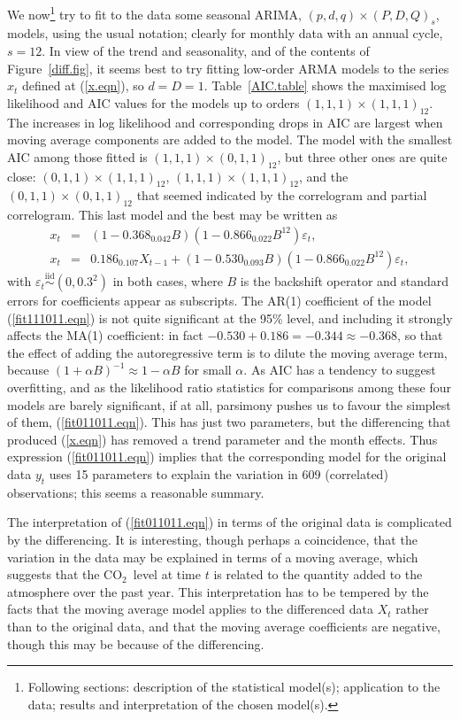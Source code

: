 \documentclass[a4paper,11pt]{article}\usepackage[]{graphicx}\usepackage[]{color}
\newcommand{\iid}{\stackrel{\mathrm{iid}}{\sim}}
\def\CO{{CO$_{2}$}}
\begin{document}
We now\footnote{Following sections: description of the statistical model(s); application to the data; results and interpretation of the chosen model(s).}  try to fit to the data some seasonal ARIMA, $(p,d,q)\times(P,D,Q)_s$, models, using the usual notation; clearly for monthly data with an annual cycle, $s=12$.  In view of the trend and seasonality, and of the contents of Figure~\ref{diff.fig}, it seems best to try fitting low-order ARMA models to the series $x_t$ defined at (\ref{x.eqn}), so $d=D=1$.  Table~\ref{AIC.table} shows the maximised log likelihood and AIC values for the models up to orders $(1,1,1)\times (1,1,1)_{12}$. The increases in log likelihood and corresponding drops in AIC are largest when moving average components are added to the model.  The model with the smallest AIC among those fitted is $(1,1,1)\times (0,1,1)_{12}$, but three other ones are quite close: $(0,1,1)\times (1,1,1)_{12}$, $(1,1,1)\times (1,1,1)_{12}$, and the $(0,1,1)\times (0,1,1)_{12}$ that seemed indicated by the correlogram and partial correlogram. This last model and the best may be written as
\begin{eqnarray}
\label{fit011011.eqn}
x_t &=& (1-0.368_{0.042}B) (1-0.866_{0.022}B^{12})\varepsilon_t, \\
\label{fit111011.eqn}
x_t &=& 0.186_{0.107}X_{t-1}+(1-0.530_{0.093}B) (1-0.866_{0.022}B^{12})\varepsilon_t, 
\end{eqnarray}
with $\varepsilon_t \iid (0, 0.3^2)$ in both cases, where $B$ is the backshift operator and standard errors for coefficients appear as subscripts.  The AR(1) coefficient of the model (\ref{fit111011.eqn}) is not quite significant at the 95\% level, and including it strongly affects the MA(1) coefficient: in fact $-0.530+0.186=-0.344\approx -0.368$, so that the effect of adding the autoregressive term is to dilute the moving average term, because $(1+\alpha B)^{-1} \approx 1 - \alpha B$ for small $\alpha$. As AIC has a tendency to suggest overfitting, and as the likelihood ratio statistics for comparisons among these four models are barely significant, if at all, parsimony pushes us to favour the simplest of them, (\ref{fit011011.eqn}).  This has just two parameters, but the differencing that produced (\ref{x.eqn}) has removed a trend parameter and the month effects. Thus expression (\ref{fit011011.eqn}) implies that the corresponding model for the original data $y_t$ uses 15 parameters to explain the variation in 609 (correlated) observations; this seems a reasonable summary.

The interpretation of (\ref{fit011011.eqn}) in terms of the original data is complicated by the differencing. It is interesting, though perhaps a coincidence, that the variation in the data may be explained in terms of a moving average, which suggests that the \CO\  level at time $t$ is related to the quantity added to the atmosphere over the past year. This interpretation has to be tempered by the facts that the moving average model applies to the differenced data $X_t$ rather than to the original data, and that the moving average coefficients are negative, though this may be because of the differencing.
\end{document}
